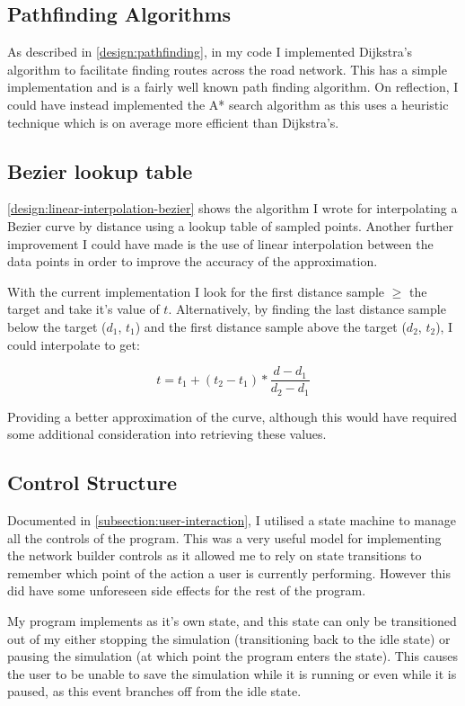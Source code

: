     \subsection{Pathfinding Algorithms}

        As described in \autoref{design:pathfinding}, in my code I implemented Dijkstra's algorithm to facilitate finding routes across the road network. This has a simple implementation and is a fairly well known path finding algorithm. On reflection, I could have instead implemented the A* search algorithm as this uses a heuristic technique which is on average more efficient than Dijkstra's.

    \subsection{Bezier lookup table}

        \autoref{design:linear-interpolation-bezier} shows the algorithm I wrote for interpolating a Bezier curve by distance using a lookup table of sampled points. Another further improvement I could have made is the use of linear interpolation between the data points in order to improve the accuracy of the approximation.

        With the current implementation I look for the first distance sample $\geq$ the target and take it's value of $t$. Alternatively, by finding the last distance sample below the target ($d_1$, $t_1$) and the first distance sample above the target ($d_2$, $t_2$), I could interpolate to get:

        \[t = t_1 + (t_2 - t_1) * \frac{d - d_1}{d_2 - d_1}\]

        Providing a better approximation of the curve, although this would have required some additional consideration into retrieving these values.

    \subsection{Control Structure}

        Documented in \autoref{subsection:user-interaction}, I utilised a state machine to manage all the controls of the program. This was a very useful model for implementing the network builder controls as it allowed me to rely on state transitions to remember which point of the action a user is currently performing. However this did have some unforeseen side effects for the rest of the program.

        My program implements  as it's own state, and this state can only be transitioned out of my either stopping the simulation (transitioning back to the idle state) or pausing the simulation (at which point the program enters the  state). This causes the user to be unable to save the simulation while it is running or even while it is paused, as this event branches off from the idle state.


